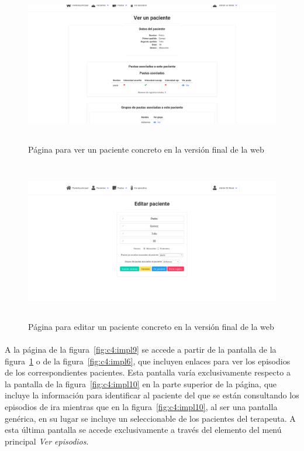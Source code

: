 \begin{figure}[H]
    \centering
    \includegraphics[height=7cm, width=\textwidth]{Imagenes/3-verPaciente.png}
    \caption[Página para ver un paciente concreto en la versión final de la web]{Página para ver un paciente concreto en la versión final de la web}
    \label{fig:c4:impl7}
\end{figure}

\begin{figure}[H]
    \centering
    \includegraphics[height=7cm, width=\textwidth]{Imagenes/4-editarPaciente.png}
    \caption[Página para editar un paciente concreto en la versión final de la web]{Página para editar un paciente concreto en la versión final de la web}
    \label{fig:c4:impl8}
\end{figure}

\paragraph{}
A la página de la figura~\ref{fig:c4:impl9} se accede a partir de la pantalla de la figura~\ref{fig:c4:impl7} o de la figura~\ref{fig:c4:impl6}, que incluyen enlaces para ver los episodios de los correspondientes pacientes. Esta pantalla varía exclusivamente respecto a la pantalla de la figura~\ref{fig:c4:impl10} en la parte superior de la página, que incluye la información para identificar al paciente del que se están consultando los episodios de ira mientras que en la figura~\ref{fig:c4:impl10}, al ser una pantalla genérica, en su lugar se incluye un seleccionable de los pacientes del terapeuta. A esta última pantalla se accede exclusivamente a través del elemento del menú principal \textit{Ver episodios}.

